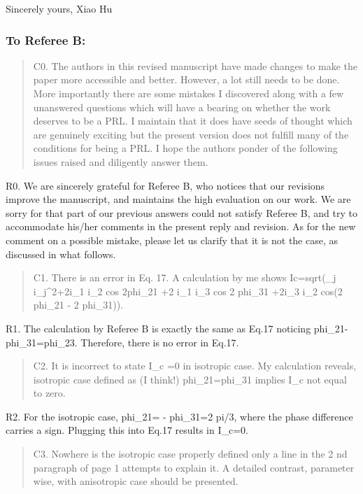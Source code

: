 \documentclass[11pt]{article}
\begin{document}
Sincerely yours, Xiao Hu

\hypertarget{to-referee-b}{%
\subsubsection{To Referee B:}\label{to-referee-b}}

\begin{quote}
C0. The authors in this revised manuscript have made changes to make the
paper more accessible and better. However, a lot still needs to be done.
More importantly there are some mistakes I discovered along with a few
unanswered questions which will have a bearing on whether the work
deserves to be a PRL. I maintain that it does have seeds of thought
which are genuinely exciting but the present version does not fulfill
many of the conditions for being a PRL. I hope the authors ponder of the
following issues raised and diligently answer them.
\end{quote}

R0. We are sincerely grateful for Referee B, who notices that our
revisions improve the manuscript, and maintains the high evaluation on
our work. We are sorry for that part of our previous answers could not
satisfy Referee B, and try to accommodate his/her comments in the
present reply and revision. As for the new comment on a possible
mistake, please let us clarify that it is not the case, as discussed in
what follows.

\begin{quote}
C1. There is an error in Eq. 17. A calculation by me shows
Ic=sqrt(\sum\_j i\_j\^{}2+2i\_1 i\_2 cos 2phi\_21 +2 i\_1 i\_3 cos 2
phi\_31 +2i\_3 i\_2 cos(2 phi\_21 - 2 phi\_31)).
\end{quote}

R1. The calculation by Referee B is exactly the same as Eq.17 noticing
phi\_21-phi\_31=phi\_23. Therefore, there is no error in Eq.17.

\begin{quote}
C2. It is incorrect to state I\_c =0 in isotropic case. My calculation
reveals, isotropic case defined as (I think!) phi\_21=phi\_31 implies
I\_c not equal to zero.
\end{quote}

R2. For the isotropic case, phi\_21= - phi\_31=2 pi/3, where the phase
difference carries a sign. Plugging this into Eq.17 results in I\_c=0.

\begin{quote}
C3. Nowhere is the isotropic case properly defined only a line in the 2
nd paragraph of page 1 attempts to explain it. A detailed contrast,
parameter wise, with anisotropic case should be presented.
\end{quote}
\end{document}
